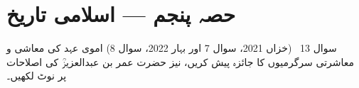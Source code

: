 %

\section*{حصہ پنجم --- اسلامی تاریخ}

\begin{sawal}{سوال \textenglish{13} \ \textnormal{\small(خزاں \textenglish{2021}، سوال \textenglish{7} اور بہار \textenglish{2022}، سوال \textenglish{8})}}
اموی عہد کی معاشی و معاشرتی سرگرمیوں کا جائزہ پیش کریں، نیز حضرت عمر بن
عبدالعزیزؒ کی اصلاحات پر نوٹ لکھیں۔
\end{sawal}

